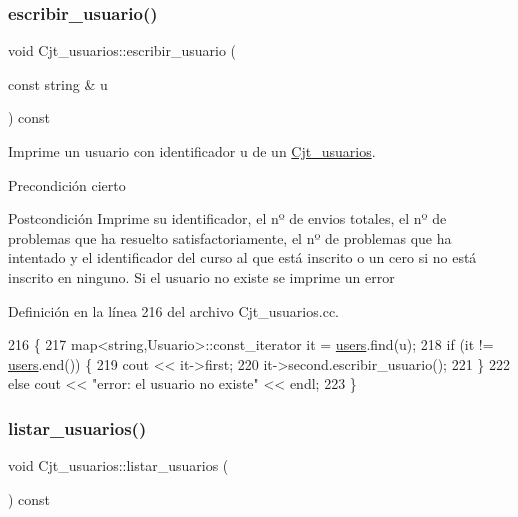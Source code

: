 \subsubsection{\texorpdfstring{escribir\+\_\+usuario()}{escribir\_usuario()}}
{\footnotesize\ttfamily void Cjt\+\_\+usuarios\+::escribir\+\_\+usuario (\begin{DoxyParamCaption}\item[{const string \&}]{u }\end{DoxyParamCaption}) const}



Imprime un usuario con identificador u de un \mbox{\hyperlink{class_cjt__usuarios}{Cjt\+\_\+usuarios}}. 

\begin{DoxyPrecond}{Precondición}
cierto 
\end{DoxyPrecond}
\begin{DoxyPostcond}{Postcondición}
Imprime su identificador, el nº de envios totales, el nº de problemas que ha resuelto satisfactoriamente, el nº de problemas que ha intentado y el identificador del curso al que está inscrito o un cero si no está inscrito en ninguno. Si el usuario no existe se imprime un error 
\end{DoxyPostcond}


Definición en la línea 216 del archivo Cjt\+\_\+usuarios.\+cc.


\begin{DoxyCode}
216                                                                \{
217         map<string,Usuario>::const\_iterator it = \mbox{\hyperlink{class_cjt__usuarios_a0b702ca0184d6fb2674cc827d39d5bff}{users}}.find(u);
218         \textcolor{keywordflow}{if} (it != \mbox{\hyperlink{class_cjt__usuarios_a0b702ca0184d6fb2674cc827d39d5bff}{users}}.end()) \{
219           cout << it->first;
220           it->second.escribir\_usuario();
221         \}
222         \textcolor{keywordflow}{else} cout << \textcolor{stringliteral}{"error: el usuario no existe"} << endl;
223       \}
\end{DoxyCode}
\mbox{\label{class_cjt__usuarios_adb9a7441da7fb87a524142aaf6e61853}} 
\subsubsection{\texorpdfstring{listar\+\_\+usuarios()}{listar\_usuarios()}}
{\footnotesize\ttfamily void Cjt\+\_\+usuarios\+::listar\+\_\+usuarios (\begin{DoxyParamCaption}{ }\end{DoxyParamCaption}) const}



